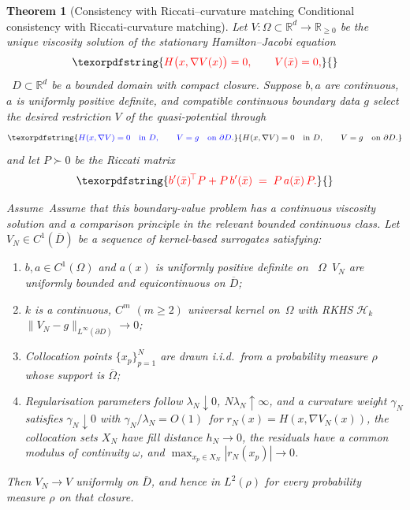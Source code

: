 \documentclass[11pt]{article}
\theoremstyle{plain}      %
\newtheorem{theorem}{Theorem}[section]     %
\theoremstyle{definition} %
\providecommand{\DIFaddtex}[1]{{\protect\color{blue}#1}} %
\providecommand{\DIFdeltex}[1]{{\protect\color{red}#1}} %
\providecommand{\DIFaddbegin}{} %
\providecommand{\DIFaddend}{} %
\providecommand{\DIFdelbegin}{} %
\providecommand{\DIFdelend}{} %
\providecommand{\DIFadd}[1]{\texorpdfstring{\DIFaddtex{#1}}{#1}} %
\providecommand{\DIFdel}[1]{\texorpdfstring{\DIFdeltex{#1}}{}} %
\newcommand{\DIFscaledelfig}{1.0}
\newlength{\DIFdelgraphicswidth} %
\newlength{\DIFdelgraphicsheight} %
\newcommand{\DIFaddincludegraphics}[2][]{{\color{blue}\fbox{\DIFOincludegraphics[#1]{#2}}}} %
\newcommand{\DIFdelincludegraphics}[2][]{%
\sbox{\DIFdelgraphicsbox}{\DIFOincludegraphics[#1]{#2}}%
\settoboxwidth{\DIFdelgraphicswidth}{\DIFdelgraphicsbox} %
\settoboxtotalheight{\DIFdelgraphicsheight}{\DIFdelgraphicsbox} %
\scalebox{\DIFscaledelfig}{%
\parbox[b]{\DIFdelgraphicswidth}{\usebox{\DIFdelgraphicsbox}\\[-\baselineskip] \rule{\DIFdelgraphicswidth}{0em}}\llap{\resizebox{\DIFdelgraphicswidth}{\DIFdelgraphicsheight}{%
\setlength{\unitlength}{\DIFdelgraphicswidth}%
\begin{picture}(1,1)%
\thicklines\linethickness{2pt} %
{\color[rgb]{1,0,0}\put(0,0){\framebox(1,1){}}}%
{\color[rgb]{1,0,0}\put(0,0){\line( 1,1){1}}}%
{\color[rgb]{1,0,0}\put(0,1){\line(1,-1){1}}}%
\end{picture}%
}\hspace*{3pt}}} %
} %
\DeclareRobustCommand{\DIFaddbegin}{\DIFOaddbegin \let\includegraphics\DIFaddincludegraphics} %
\DeclareRobustCommand{\DIFaddend}{\DIFOaddend \let\includegraphics\DIFOincludegraphics} %
\DeclareRobustCommand{\DIFdelbegin}{\DIFOdelbegin \let\includegraphics\DIFdelincludegraphics} %
\DeclareRobustCommand{\DIFdelend}{\DIFOaddend \let\includegraphics\DIFOincludegraphics} %
\begin{document}
\DIFdelbegin %
\DIFdelend \DIFaddbegin \begin{theorem}[\DIFdel{Consistency with Riccati--curvature matching} \DIFadd{Conditional consistency with Riccati-curvature matching}]\DIFaddend \label{thm:consistency-curvature}
Let \DIFdelbegin \DIFdel{$V:\Omega\subset\mathbb R^{d}\to\mathbb R_{\ge0}$ be the unique viscosity solution of the stationary Hamilton--Jacobi equation
}\[
  \DIFdel{H\bigl(x,\nabla V(x)\bigr)=0,\qquad V(\bar x)=0,
}\]%
\DIFdelend\ \DIFaddbegin \DIFadd{$D\subset\mathbb R^d$ be a bounded domain with compact closure. Suppose $b,a$ are continuous, $a$ is uniformly positive definite, and compatible continuous boundary data $g$ select the desired restriction $V$ of the quasi-potential through
}\[
\DIFadd{H(x,\nabla V)=0\quad\text{in }D,\qquad V=g\quad\text{on }\partial D.
}\]\DIFaddend 
\DIFdelbegin \DIFdel{and let $P\succ0$ be the Riccati matrix
}\[
  \DIFdel{b'(\bar x)^{\!\top}P + P\,b'(\bar x) \;=\; P\,a(\bar x)\,P.
}\]%

\DIFdel{Assume}\DIFdelend\ \DIFaddbegin \DIFadd{Assume that this boundary-value problem has a continuous viscosity solution and a comparison principle in the relevant bounded continuous class. Let $V_N\in C^1(\overline D)$ be a sequence of kernel-based surrogates satisfying}\DIFaddend :
\begin{enumerate}
\item \DIFdelbegin %
\DIFdel{$b,a\in C^{1}(\Omega)$ and $a(x)$ is uniformly positive definite on ~$\Omega$}\DIFdelend\ \DIFaddbegin \DIFadd{$V_N$ are uniformly bounded and equicontinuous on $\overline D$}\DIFaddend ;
\item \DIFdelbegin %
\DIFdel{$k$ is a continuous, $C^{m}$ $(m\!\ge2)$ \emph{universal} kernel on~$\Omega$ with RKHS $\mathcal H_{k}$}\DIFdelend\ \DIFaddbegin \DIFadd{$\|V_N-g\|_{L^\infty(\partial D)}\to0$}\DIFaddend ;
\item \DIFdelbegin %
\DIFdel{Collocation points $\{x_{p}\}_{p=1}^{N}$ are drawn i.i.d.\ from a probability measure $\rho$ whose support is $\overline\Omega$;
  }%
\item%
\DIFdel{Regularisation parameters follow
        $\lambda_{N}\!\downarrow\!0$, $N\lambda_{N}\!\uparrow\!\infty$, and a curvature weight $\gamma_{N}$ satisfies
        $\gamma_{N}\!\downarrow\!0$ with $\gamma_{N}/\lambda_{N}=O(1)$}\DIFdelend\ \DIFaddbegin \DIFadd{for $r_N(x)=H(x,\nabla V_N(x))$, the collocation sets $X_N$ have fill distance $h_N\to0$, the residuals have a common modulus of continuity $\omega$, and $\max_{x_p\in X_N}|r_N(x_p)|\to0$}\DIFaddend .
\end{enumerate}
\DIFaddbegin \DIFadd{Then $V_N\to V$ uniformly on $\overline D$, and hence in $L^2(\rho)$ for every probability measure $\rho$ on that closure.
}\DIFaddend 


\end{theorem}
\end{document}
